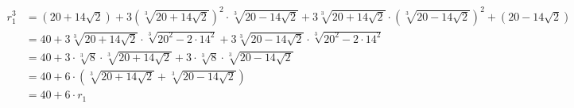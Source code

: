 \begin{align*}
	r_1^3 &=(20+14\sqrt{2})+3\left(\sqrt[3]{20+14\sqrt{2}}\right)^2\cdot\sqrt[3]{20-14\sqrt{2}}+3\sqrt[3]{20+14\sqrt{2}}\cdot\left(\sqrt[3]{20-14\sqrt{2}}\right)^2+(20-14\sqrt{2}) \\
	&= 40+3\sqrt[3]{20+14\sqrt{2}}\cdot\sqrt[3]{20^2-2\cdot14^2}+3\sqrt[3]{20-14\sqrt{2}}\cdot\sqrt[3]{20^2-2\cdot14^2}\\
	&=40+3\cdot\sqrt[3]{8}\cdot\sqrt[3]{20+14\sqrt{2}}+3\cdot\sqrt[3]{8}\cdot\sqrt[3]{20-14\sqrt{2}}\\
	&=40+6\cdot\left(\sqrt[3]{20+14\sqrt{2}}+\sqrt[3]{20-14\sqrt{2}}\right)\\
	&=40+6\cdot r_1
\end{align*}